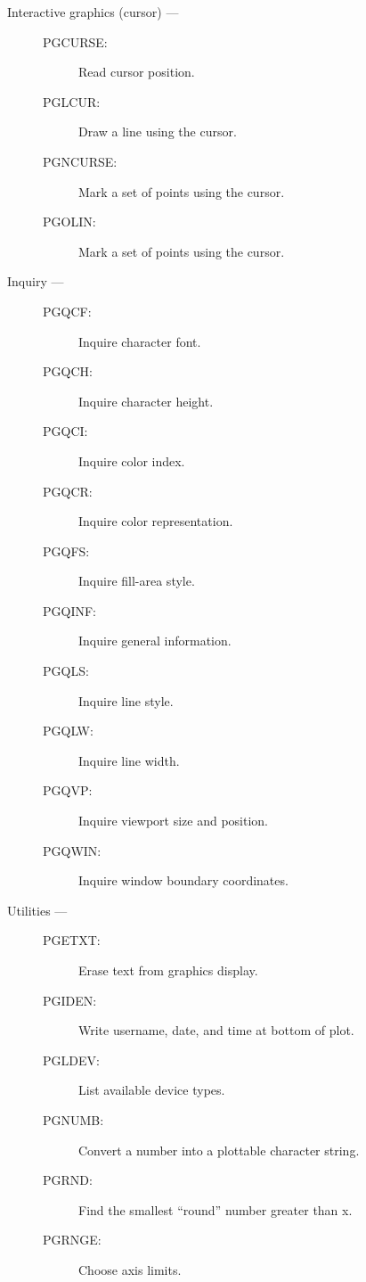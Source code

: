 \begin{description}
\item [Interactive graphics (cursor) ---]

\begin{description}
\item [PGCURSE:]  Read cursor position.
\item [PGLCUR:]  Draw a line using the cursor.
\item [PGNCURSE:]  Mark a set of points using the cursor.
\item [PGOLIN:]  Mark a set of points using the cursor.
\end{description}

\item [Inquiry ---]

\begin{description}
\item [PGQCF:]  Inquire character font.
\item [PGQCH:]  Inquire character height.
\item [PGQCI:]  Inquire color index.
\item [PGQCR:]  Inquire color representation.
\item [PGQFS:]  Inquire fill-area style.
\item [PGQINF:]  Inquire general information.
\item [PGQLS:]  Inquire line style.
\item [PGQLW:]  Inquire line width.
\item [PGQVP:]  Inquire viewport size and position.
\item [PGQWIN:]  Inquire window boundary coordinates.
\end{description}

\item [Utilities ---]

\begin{description}
\item [PGETXT:]  Erase text from graphics display.
\item [PGIDEN:]  Write username, date, and time at bottom of plot.
\item [PGLDEV:]  List available device types.
\item [PGNUMB:]  Convert a number into a plottable character string.
\item [PGRND:]  Find the smallest ``round'' number greater than x.
\item [PGRNGE:]  Choose axis limits.
\end{description}

\end{description}


